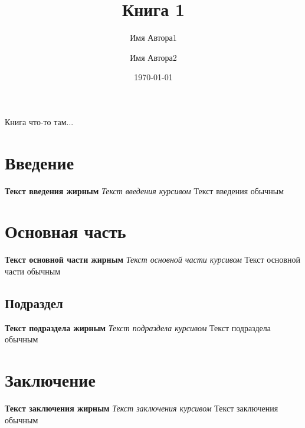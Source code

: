 \documentclass[14pt]{article}
\title{Книга 1}
\author{Имя Автора1 \and Имя Автора2}
\date{\today}
\begin{document}
\maketitle

\begin{center}
    {\huge Книга что-то там...}
\end{center}
\thispagestyle{empty}

\newpage
\hfill \break
\renewcommand{\contentsname}{Содержание}
\tableofcontents
\thispagestyle{empty}

\newpage
\section{Введение}
\tiny{\textbf{Текст введения жирным} \textit{Текст введения курсивом} Текст введения обычным}

\section{Основная часть}
\large{\textbf{Текст основной части жирным} \textit{Текст основной части курсивом} Текст основной части обычным}

\subsection{Подраздел}
\large{\textbf{Текст подраздела жирным} \textit{Текст подраздела курсивом} Текст подраздела обычным}

\section{Заключение}
\huge{\textbf{Текст заключения жирным} \textit{Текст заключения курсивом} Текст заключения обычным}
\end{document}
